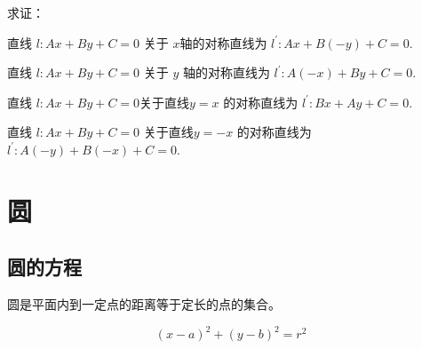 \begin{homework}求证：

直线 $ l: A x+B y+C=0 $ 关于 $ x  $轴的对称直线为  $l^{\prime}: A x+B(-y)+   C=0 .$

直线 $ l: A x+B y+C=0 $ 关于 $ y$  轴的对称直线为 $ l^{\prime}: A(-x)+B y+   C=0 .$

直线 $ l: A x+B y+C=0  $关于直线$  y=x $ 的对称直线为  $l^{\prime}: B x+   A y+C=0 .$

直线 $ l: A x+B y+C=0 $ 关于直线$  y=-x $ 的对称直线为 $ l^{\prime}: A(-y)+   B(-x)+C=0 .$
\end{homework}
\begin{homework}
    
\end{homework}
\begin{homework}
    
\end{homework}
\begin{homework}
    
\end{homework}
\begin{homework}
    
\end{homework}
\begin{homework}
    
\end{homework}
\begin{homework}
    
\end{homework}
\begin{homework}
    
\end{homework}
\begin{homework}
    
\end{homework}
\begin{homework}
    
\end{homework}

\clearpage


\section{圆}
\subsection{圆的方程}
\begin{definition}
    圆是平面内到一定点的距离等于定长的点的集合。
\end{definition}
\begin{theorem}[圆的标准方程]
    \begin{equation}
        (x-a)^2+(y-b)^2=r^2
    \end{equation}
\end{theorem}

